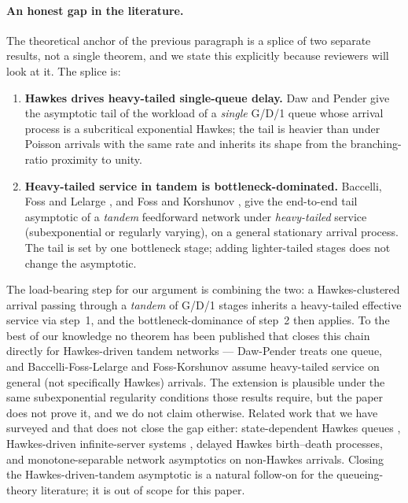 \documentclass[11pt]{article}
\begin{document}
\paragraph{An honest gap in the literature.} The theoretical anchor of the previous paragraph is a splice of two separate results, not a single theorem, and we state this explicitly because reviewers will look at it. The splice is:

\begin{enumerate}
    \item \textbf{Hawkes drives heavy-tailed single-queue delay.} Daw and Pender \citep{dawpender2018queues} give the asymptotic tail of the workload of a \emph{single} G/D/1 queue whose arrival process is a subcritical exponential Hawkes; the tail is heavier than under Poisson arrivals with the same rate and inherits its shape from the branching-ratio proximity to unity.
    \item \textbf{Heavy-tailed service in tandem is bottleneck-dominated.} Baccelli, Foss and Lelarge \citep{baccellifosslelarge2005}, and Foss and Korshunov \citep{fosskorshunov2000}, give the end-to-end tail asymptotic of a \emph{tandem} feedforward network under \emph{heavy-tailed} service (subexponential or regularly varying), on a general stationary arrival process. The tail is set by one bottleneck stage; adding lighter-tailed stages does not change the asymptotic.
\end{enumerate}

The load-bearing step for our argument is combining the two: a Hawkes-clustered arrival passing through a \emph{tandem} of G/D/1 stages inherits a heavy-tailed effective service via step~1, and the bottleneck-dominance of step~2 then applies. To the best of our knowledge no theorem has been published that closes this chain directly for Hawkes-driven tandem networks --- Daw-Pender treats one queue, and Baccelli-Foss-Lelarge and Foss-Korshunov assume heavy-tailed service on general (not specifically Hawkes) arrivals. The extension is plausible under the same subexponential regularity conditions those results require, but the paper does not prove it, and we do not claim otherwise. Related work that we have surveyed and that does not close the gap either: state-dependent Hawkes queues \citep{gaozhu2024statedep}, Hawkes-driven infinite-server systems \citep{koopsboxmamandjes2018}, delayed Hawkes birth--death processes, and monotone-separable network asymptotics on non-Hawkes arrivals. Closing the Hawkes-driven-tandem asymptotic is a natural follow-on for the queueing-theory literature; it is out of scope for this paper.
\end{document}
